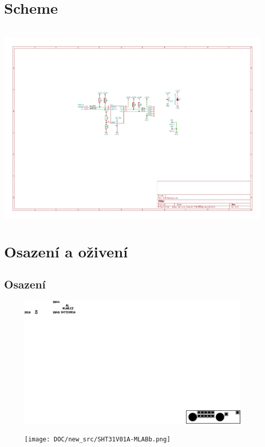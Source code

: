\documentclass[12pt,a4paper]{article}
\begin{document}
\section{Scheme}\ \includegraphics[angle=90,origin=c,width=\textwidth-1cm]{SCH_PCB/SHT31V01A.pdf}

\section{Osazení a oživení}\label{osazenuxed-a-oux17eivenuxed}

\subsection{Osazení}\label{osazenuxed}

\begin{figure}[htbp]
\centering
\includegraphics{DOC/new_src/SHT31V01A-MLABa.png}
\caption{}
\end{figure}

\begin{figure}[htbp]
\centering
\texttt{[image: DOC/new\_src/SHT31V01A-MLABb.png]}
\caption{}
\end{figure}
\end{document}
